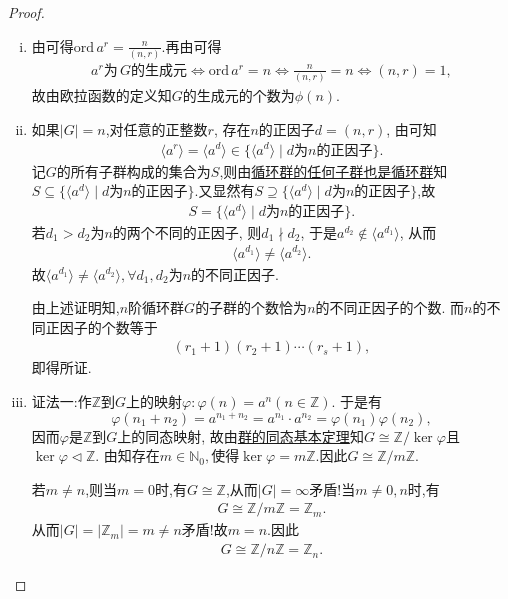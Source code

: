 \documentclass[../../main.tex]{subfiles}%
\begin{document}
\begin{proof}
\begin{enumerate}[(1)]
\begin{enumerate}[(i)]
\item 由可得$\text{ord}\,a^r = \frac{n}{(n,r)}$.再由可得
\begin{align*}
a^r \text{为} \, G \text{的生成元} \iff \text{ord}\,a^r = n \iff \frac{n}{(n,r)} = n \iff (n,r) = 1,
\end{align*}
故由欧拉函数的定义知$G$的生成元的个数为$\phi(n)$.

\item 如果$|G|=n$,对任意的正整数$r$, 存在$n$的正因子$d=(n,r)$, 由可知
\begin{align*}
\langle a^r\rangle=\langle a^d\rangle\in \{\langle a^d\rangle\mid d\text{为}n\text{的正因子}\}.
\end{align*}
记$G$的所有子群构成的集合为$S$,则由\hyperref[theorem:循环群的任何子群也是循环群]{循环群的任何子群也是循环群}知$S\subseteq \{\langle a^d\rangle\mid d\text{为}n\text{的正因子}\}$.又显然有$S\supseteq \{\langle a^d\rangle\mid d\text{为}n\text{的正因子}\}$,故
\begin{align*}
S=\{\langle a^d\rangle\mid d\text{为}n\text{的正因子}\}.
\end{align*}
若$d_1>d_2$为$n$的两个不同的正因子, 则$d_1\nmid d_2$, 于是$a^{d_2}\notin\langle a^{d_1}\rangle$, 从而
\begin{align*}
\langle a^{d_1}\rangle\neq\langle a^{d_2}\rangle.
\end{align*}
故$\langle a^{d_1} \rangle \neq \langle a^{d_2} \rangle,\forall d_1,d_2$为$n$的不同正因子.

由上述证明知,$n$阶循环群$G$的子群的个数恰为$n$的不同正因子的个数. 而$n$的不同正因子的个数等于
\begin{align*}
(r_1 + 1)(r_2 + 1)\cdots(r_s + 1),
\end{align*}
即得所证.

\item {\color{blue}证法一:}作$\mathbb{Z}$到$G$上的映射$\varphi:\varphi(n)=a^n(n\in\mathbb{Z})$. 于是有
\[
\varphi(n_1+n_2)=a^{n_1+n_2}=a^{n_1}\cdot a^{n_2}=\varphi(n_1)\varphi(n_2),
\]
因而$\varphi$是$\mathbb{Z}$到$G$上的同态映射, 故由\hyperref[theorem:群的同态基本定理]{群的同态基本定理}知$G\cong \mathbb{Z}/\ker\varphi$且$\ker \varphi \lhd \mathbb{Z}$. 由知存在$m\in \mathbb{N}_0,$使得$\ker\varphi=m\mathbb{Z}$.因此$G\cong \mathbb{Z}/m\mathbb{Z}$.

若$m\neq n$,则当$m=0$时,有$G\cong \mathbb{Z}$,从而$|G|=\infty$矛盾!当$m\neq 0,n$时,有
\begin{align*}
G\cong\mathbb{Z}/m\mathbb{Z}=\mathbb{Z}_m.
\end{align*}
从而$|G|=|\mathbb{Z}_m|=m\neq n$矛盾!故$m=n$.因此
\begin{align*}
G\cong \mathbb{Z}/n\mathbb{Z}=\mathbb{Z}_n.
\end{align*}


\end{enumerate}
\end{enumerate}
\end{proof}
\end{document}
